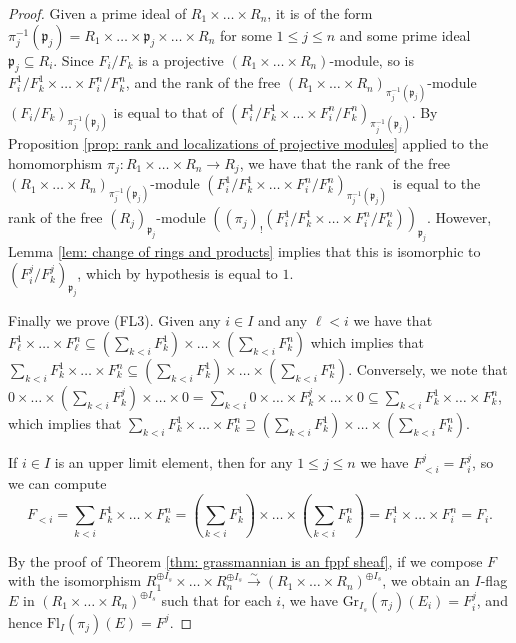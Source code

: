 \documentclass[oneside,11pt]{amsart}
\newcommand{\fp}{\ensuremath{\mathfrak{p}}}
\newcommand{\Fl}{\ensuremath{\text{Fl}}}
\newcommand{\Gr}{\ensuremath{\text{Gr}}}
\theoremstyle{definition}
\newtheorem{proof techniques}{Proof Techniques}
\begin{document}
\begin{proof}
Given a prime ideal of $R_1 \times \ldots \times R_n$, it is of the form $\pi_j^{-1}(\fp_j) = R_1 \times \ldots \times \fp_j \times \ldots \times R_n$ for some $1 \leq j \leq n$ and some prime ideal $\fp_j \subseteq R_i$. Since $F_i / F_k$ is a projective $(R_1 \times \ldots \times R_n)$-module, so is $F_i^1 / F_k^1 \times \ldots \times F_i^n  / F_k^n$, and the rank of the free $(R_1 \times \ldots \times R_n)_{\pi_j^{-1}(\fp_j)}$-module $(F_i / F_k)_{\pi_j^{-1}(\fp_j)}$ is equal to that of $(F_i^1 / F_k^1 \times \ldots \times F_i^n  / F_k^n)_{\pi_j^{-1}(\fp_j)}$. By Proposition \ref{prop: rank and localizations of projective modules} applied to the homomorphism $\pi_j : R_1 \times \ldots \times R_n \to R_j$, we have that the rank of the free $(R_1 \times \ldots \times R_n)_{\pi_j^{-1}(\fp_j)}$-module $(F_i^1 / F_k^1 \times \ldots \times F_i^n  / F_k^n)_{\pi_j^{-1}(\fp_j)}$ is equal to the rank of the free $(R_j)_{\fp_j}$-module $((\pi_j)_! ( F_i^1 / F_k^1 \times \ldots \times F_i^n  / F_k^n ) )_{\fp_j}$. However, Lemma \ref{lem: change of rings and products} implies that this is isomorphic to $(F_i^j / F_k^j )_{\fp_j}$, which by hypothesis is equal to $1$. 

Finally we prove (FL3). Given any $i \in I$ and any $\ell < i$ we have that $F_\ell^1 \times \ldots \times F_\ell^n \subseteq  \left(\sum_{k < i} F_k^1 \right) \times \ldots \times  \left( \sum_{k < i} F_k^n \right)$ which implies that $\sum_{k < i} F_k^1 \times \ldots \times F_k^n \subseteq \left(\sum_{k < i} F_k^1 \right) \times \ldots \times  \left( \sum_{k < i} F_k^n \right)$. Conversely, we note that $0 \times \ldots \times \left(\sum_{k < i} F_k^j \right) \times \ldots \times 0 = \sum_{k < i} 0 \times \ldots \times F_k^j \times \ldots \times 0 \subseteq \sum_{k < i} F_k^1 \times \ldots \times F_k^n$, which implies that $\sum_{k < i} F_k^1 \times \ldots \times F_k^n \supseteq \left(\sum_{k < i} F_k^1 \right) \times \ldots \times  \left( \sum_{k < i} F_k^n \right)$. 

If $i \in I$ is an upper limit element, then for any $1 \leq j \leq n$ we have $F^j_{< i} = F^j_i$, so we can compute 
\begin{equation*}
F_{<i} = \sum_{k < i} F_k^1 \times \ldots \times F_k^n = \left(\sum_{k < i} F_k^1 \right) \times \ldots \times  \left( \sum_{k < i} F_k^n \right) = F_i^1 \times \ldots \times F_i^n = F_i. 
\end{equation*}

By the proof of Theorem \ref{thm: grassmannian is an fppf sheaf}, if we compose $F$ with the isomorphism $R_1^{\oplus I_s} \times \ldots \times R_n^{\oplus I_s} \overset{\sim}{\to} (R_1 \times \ldots \times R_n)^{\oplus I_s}$, we obtain an $I$-flag $E$ in $(R_1 \times \ldots \times R_n)^{\oplus I_s}$ such that for each $i$, we have $\Gr_{I_s}(\pi_j)(E_i) = F^j_i$, and hence $\Fl_I(\pi_j)(E) = F^j$. 


\end{proof}
\end{document}
